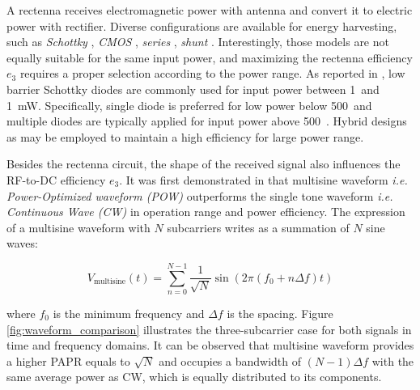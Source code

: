 A rectenna receives electromagnetic power with antenna and convert it to electric power with rectifier. Diverse configurations are available for energy harvesting, such as \textit{Schottky} \cite{Akkermans2005, Boaventura2013}, \textit{CMOS} \cite{Stoopman2014, Valenta2014}, \textit{series} \cite{Georgiadis2011, Collado2013}, \textit{shunt} \cite{McSpadden1998, Guo2012}. Interestingly, those models are not equally suitable for the same input power, and maximizing the rectenna efficiency ${e_3}$ requires a proper selection according to the power range. As reported in \cite{Valenta2014, Costanzo2016}, low barrier Schottky diodes are commonly used for input power between 1~\muW and 1~mW. Specifically, single diode is preferred for low power below 500~\muW and multiple diodes are typically applied for input power above 500~\muW \cite{Clerckx2019}. Hybrid designs as \cite{Sun2013} may be employed to maintain a high efficiency for large power range.

Besides the rectenna circuit, the shape of the received signal also influences the RF-to-DC efficiency ${e_3}$. It was first demonstrated in \cite{Trotter2009} that multisine waveform \textit{i.e. Power-Optimized waveform (POW)} outperforms the single tone waveform \textit{i.e. Continuous Wave (CW)} in operation range and power efficiency. The expression of a multisine waveform with $N$ subcarriers writes as a summation of $N$ sine waves:

\begin{equation}\label{eqn:multisine}
  {V_{{\text{multisine}}}}(t) = \sum\limits_{n = 0}^{N - 1} {\frac{1}{{\sqrt N }}} \sin \left( {2\pi \left( {{f_{\text{0}}} + n\Delta f} \right)t} \right)
\end{equation}

where ${{f_{\text{0}}}}$ is the minimum frequency and ${\Delta f}$ is the spacing. Figure \ref{fig:waveform_comparison} \cite{Trotter2009} illustrates the three-subcarrier case for both signals in time and frequency domains. It can be observed that multisine waveform provides a higher PAPR equals to ${\sqrt N }$ and occupies a bandwidth of $(N - 1) \Delta f$ with the same average power as CW, which is equally distributed to its components. 

